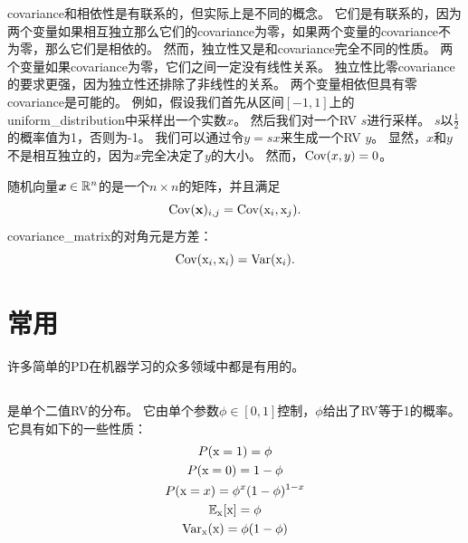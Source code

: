 \gls{covariance}和相依性是有联系的，但实际上是不同的概念。
它们是有联系的，因为两个变量如果相互独立那么它们的\gls{covariance}为零，如果两个变量的\gls{covariance}不为零，那么它们是相依的。
然而，独立性又是和\gls{covariance}完全不同的性质。
两个变量如果\gls{covariance}为零，它们之间一定没有线性关系。
独立性比零\gls{covariance}的要求更强，因为独立性还排除了非线性的关系。
两个变量相依但具有零\gls{covariance}是可能的。
例如，假设我们首先从区间$[-1, 1]$上的\gls{uniform_distribution}中采样出一个实数$x$。
然后我们对一个\gls{RV} $s$进行采样。
$s$以$\frac{1}{2}$的概率值为1，否则为-1。
我们可以通过令$y=sx$来生成一个\gls{RV} $y$。
显然，$x$和$y$不是相互独立的，因为$x$完全决定了$y$的大小。
然而，$\text{Cov}(x,y)=0$。


随机向量$\boldsymbol{\mathit{x}} \in \mathbb{R}^n$的是一个$n\times n$的矩阵，并且满足
\begin{equation}
\text{Cov}(\mathbf{x})_{i,j} = \text{Cov}(\mathrm{x}_i, \mathrm{x}_j).
\end{equation}
\gls{covariance_matrix}的对角元是方差：
\begin{equation}
\text{Cov}(\mathrm{x}_i, \mathrm{x}_i) = \text{Var}(\mathrm{x}_i).
\end{equation}

\section{常用}
\label{sec:common_probability_distributions}

许多简单的\gls{PD}在机器学习的众多领域中都是有用的。

\subsection{}
\label{sec:bernoulli_distribution}

是单个二值\gls{RV}的分布。
它由单个参数$\phi \in [0, 1]$控制，$\phi$给出了\gls{RV}等于1的概率。
它具有如下的一些性质：
\begin{gather}
P(\mathrm{x} =1) = \phi\\
P(\mathrm{x} =0) = 1-\phi\\
P(\mathrm{x} = x) = \phi^x (1-\phi)^{1-x}\\
\mathbb{E}_{\mathrm{x}}[\mathrm{x}] = \phi\\
\text{Var}_{\mathrm{x}}(\mathrm{x}) = \phi(1-\phi)
\end{gather}

\subsection{}
\label{sec:multinoulli_distribution}

